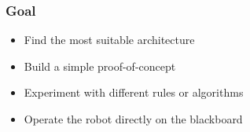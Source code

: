 \documentclass[12pt]{beamer}
\begin{document}
\begin{frame}[c]\frametitle{Goal}
\large
\begin{itemize}
  \item Find the most suitable architecture
  \item Build a simple proof-of-concept
  \item Experiment with different rules or algorithms
  \item Operate the robot directly on the blackboard
\end{itemize}
\end{frame}
\end{document}
